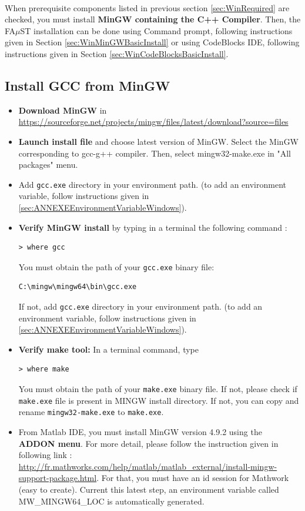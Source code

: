 \paragraph{}When prerequisite components listed in previous section \ref{sec:WinRequired} are checked, you must install \textbf{MinGW containing the C++ Compiler}. 
Then, the FA$\mu$ST installation can be done using Command prompt, following instructions given in Section \ref{sec:WinMinGWBasicInstall} or using CodeBlocks IDE, following instructions given in Section \ref{sec:WinCodeBlocksBasicInstall}. 


\subsection{Install GCC from MinGW}
\label{sec:WinInstallCompilerMinGW}

\begin{itemize}
\item \textbf{Download MinGW} in \url{https://sourceforge.net/projects/mingw/files/latest/download?source=files}
\item \textbf{Launch install file} and choose latest version of MinGW. Select the MinGW corresponding to gcc-g++ compiler. Then, select mingw32-make.exe in "All packages" menu. 
\item Add \texttt{gcc.exe} directory in your environment path. 
(to add an environment variable, follow instructions given in \ref{sec:ANNEXEEnvironmentVariableWindows}). 
\item \textbf{Verify MinGW install} by typing in a terminal the following command : 
\begin{lstlisting}
> where gcc
\end{lstlisting}
You must obtain the path of your \texttt{gcc.exe} binary file: 
\begin{lstlisting}[backgroundcolor=\color{white}]
C:\mingw\mingw64\bin\gcc.exe
\end{lstlisting}
If not, add \texttt{gcc.exe} directory in your environment path. 
(to add an environment variable, follow instructions given in \ref{sec:ANNEXEEnvironmentVariableWindows}). 

\item \textbf{Verify make tool:} In a terminal command, type
\begin{lstlisting}
> where make
\end{lstlisting}
You must obtain the path of your \texttt{make.exe} binary file. 
If not, please check if \texttt{make.exe} file is present in MINGW install directory. If not, you can copy and rename \texttt{mingw32-make.exe} to \texttt{make.exe}.

\item From Matlab IDE, you must install MinGW version 4.9.2 using the \textbf{ADDON menu}. For more detail, please follow the instruction given in following link :  
\url{http://fr.mathworks.com/help/matlab/matlab_external/install-mingw-support-package.html}. For that, you must have an id session for Mathwork (easy to create). Current this latest step, an environment variable called MW\_MINGW64\_LOC is automatically generated. 
\end{itemize}


